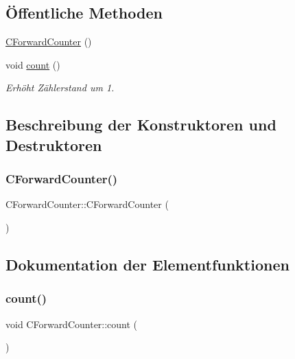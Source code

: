 \subsection*{Öffentliche Methoden}
\begin{DoxyCompactItemize}
\item 
\hyperlink{class_c_forward_counter_aeda1b05d715820f61e377a2c6fa52b2e}{C\+Forward\+Counter} ()
\item 
void \hyperlink{class_c_forward_counter_afc451afa9f8b76f70b28c08982265a86}{count} ()
\begin{DoxyCompactList}\small\item\em Erhöht Zählerstand um 1. \end{DoxyCompactList}\end{DoxyCompactItemize}


\subsection{Beschreibung der Konstruktoren und Destruktoren}
\mbox{\label{class_c_forward_counter_aeda1b05d715820f61e377a2c6fa52b2e}} 
\subsubsection{\texorpdfstring{C\+Forward\+Counter()}{CForwardCounter()}}
{\footnotesize\ttfamily C\+Forward\+Counter\+::\+C\+Forward\+Counter (\begin{DoxyParamCaption}{ }\end{DoxyParamCaption})}



\subsection{Dokumentation der Elementfunktionen}
\mbox{\label{class_c_forward_counter_afc451afa9f8b76f70b28c08982265a86}} 
\subsubsection{\texorpdfstring{count()}{count()}}
{\footnotesize\ttfamily void C\+Forward\+Counter\+::count (\begin{DoxyParamCaption}{ }\end{DoxyParamCaption})\hspace{0.3cm}{\ttfamily [virtual]}}



